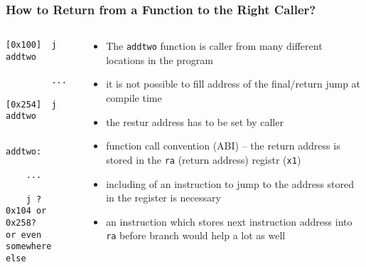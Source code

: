 \documentclass{beamer}
\begin{document}
\begin{frame}[fragile]
\frametitle{How to Return from a Function to the Right Caller?}

\begin{columns}
\begin{column}{0.3\textwidth}  
\begin{verbatim}
[0x100]  j  addtwo
         
         ...
         
[0x254]  j  addtwo
    

addtwo:

    ...
    
    j ? 
0x104 or 0x258?
or even somewhere else
\end{verbatim}
\end{column}
\begin{column}{0.7\textwidth}
\begin{itemize}
 \item The \texttt{addtwo} function is caller from many different locations in the program
 \item it is not possible to fill address of the final/return jump at compile time
 \item the restur address has to be set by caller
 \item function call convention (ABI) -- the return address is stored in the \texttt{ra} (return address) registr (\texttt{x1})
 \item including of an instruction to jump to the address stored in the register is necessary
 \item an instruction which stores next instruction address into \texttt{ra} before branch would help a lot as well
\end{itemize}
\end{column}
\end{columns}
\end{frame}
\end{document}
